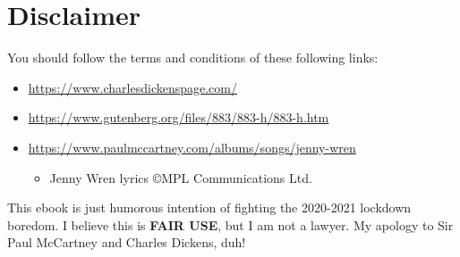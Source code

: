 \documentclass[12pt]{book}
\begin{document}
\chapter*{Disclaimer}

You should follow the terms and conditions of these following links:
\begin{itemize}
\item \url{https://www.charlesdickenspage.com/}
\item \url{https://www.gutenberg.org/files/883/883-h/883-h.htm}
\item \url{https://www.paulmccartney.com/albums/songs/jenny-wren}
\begin{itemize}
\item Jenny Wren lyrics \copyright MPL Communications Ltd.
\end{itemize}
\end{itemize}

\noindent
This ebook is just humorous intention of fighting the 2020-2021 lockdown boredom.
I believe this is \textbf{FAIR USE}, but I am not a lawyer.
My apology to Sir Paul McCartney and Charles Dickens, duh!

\end{document}
